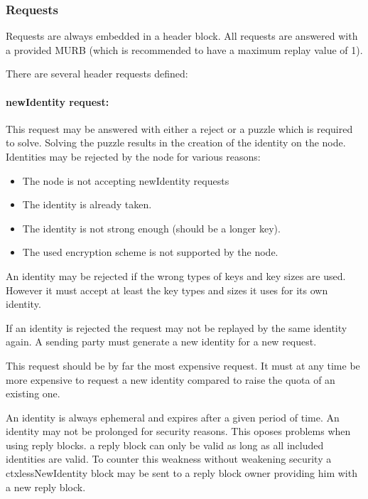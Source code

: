 \subsubsection{Requests\label{sec:request}}
Requests are always embedded in a header block. All requests are answered with a provided MURB (which is recommended to have a maximum replay value of 1).

There are several header requests defined:

\paragraph{newIdentity request:} This request may be answered with either a reject or a puzzle which is required to solve. Solving the puzzle results in the creation of the identity on the node. Identities may be rejected by the node for various reasons:

\begin{itemize}
	\item The node is not accepting newIdentity requests
	\item The identity is already taken.
	\item The identity is not strong enough (should be a longer key).
	\item The used encryption scheme is not supported by the node.
\end{itemize}

An identity may be rejected if the wrong types of keys and key sizes are used. However it must accept at least the key types and sizes it uses for its own identity.

If an identity is rejected the request may not be replayed by the same identity again. A sending party must generate a new identity for a new request. 

This request should be by far the most expensive request. It must at any time be more expensive to request a new identity compared to raise the quota of an existing one.

An identity is always ephemeral and expires after a given period of time. An identity may not be prolonged for security reasons. This oposes problems when using reply blocks. a reply block can only be valid as long as all included identities are valid. To counter this weakness without weakening security a ctxlessNewIdentity block may be sent to a reply block owner providing him with a new reply block.

